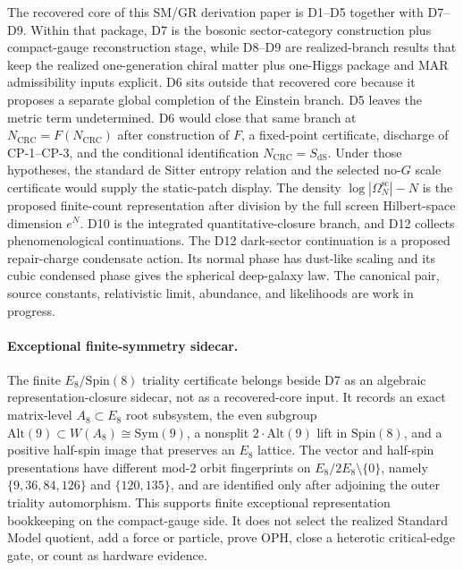 \documentclass[11pt]{article}
\begin{document}
The recovered core of this SM/GR derivation paper is D1--D5 together with D7--D9. Within that package, D7 is the bosonic sector-category construction plus compact-gauge reconstruction stage, while D8--D9 are realized-branch results that keep the realized one-generation chiral matter plus one-Higgs package and MAR admissibility inputs explicit. D6 sits outside that recovered core because it proposes a separate global completion of the Einstein branch. D5 leaves the metric term undetermined. D6 would close that same branch at \(N_{\mathrm{CRC}}=F(N_{\mathrm{CRC}})\) after construction of \(F\), a fixed-point certificate, discharge of CP-1--CP-3, and the conditional identification \(N_{\mathrm{CRC}}=S_{\mathrm{dS}}\). Under those hypotheses, the standard de Sitter entropy relation and the selected no-\(G\) scale certificate would supply the static-patch display. The density \(\log|\Omega^{\mathrm{sc}}_N|-N\) is the proposed finite-count representation after division by the full screen Hilbert-space dimension \(e^N\). D10 is the integrated quantitative-closure branch, and D12 collects phenomenological continuations. The D12 dark-sector continuation is a proposed repair-charge condensate action. Its normal phase has dust-like scaling and its cubic condensed phase gives the spherical deep-galaxy law. The canonical pair, source constants, relativistic limit, abundance, and likelihoods are work in progress.

\paragraph{Exceptional finite-symmetry sidecar.}
The finite \(E_8/\mathrm{Spin}(8)\) triality certificate belongs beside D7 as an algebraic
representation-closure sidecar, not as a recovered-core input. It records an exact
matrix-level \(A_8\subset E_8\) root subsystem, the even subgroup
\(\mathrm{Alt}(9)\subset W(A_8)\cong\mathrm{Sym}(9)\), a nonsplit
\(2\!\cdot\!\mathrm{Alt}(9)\) lift in \(\mathrm{Spin}(8)\), and a positive half-spin image that
preserves an \(E_8\) lattice. The vector and half-spin presentations have different mod-2 orbit
fingerprints on \(E_8/2E_8\setminus\{0\}\), namely \(\{9,36,84,126\}\) and \(\{120,135\}\), and
are identified only after adjoining the outer triality automorphism. This supports finite
exceptional representation bookkeeping on the compact-gauge side. It does not select the realized
Standard Model quotient, add a force or particle, prove OPH, close a heterotic critical-edge gate,
or count as hardware evidence.
\end{document}
